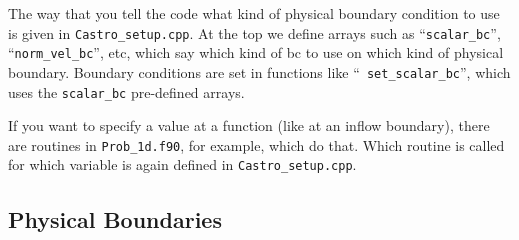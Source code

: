 The way that you tell the code what kind of physical boundary
condition to use is given in {\tt Castro\_setup.cpp}. At the top we
define arrays such as ``{\tt scalar\_bc}'', ``{\tt norm\_vel\_bc}'',
etc, which say which kind of bc to use on which kind of physical
boundary.  Boundary conditions are set in functions like ``{\tt
  set\_scalar\_bc}'', which uses the {\tt scalar\_bc} pre-defined
arrays.

If you want to specify a value at a function (like at an inflow
boundary), there are routines in {\tt Prob\_1d.f90}, for example, which do
that. Which routine is called for which variable is again defined in
{\tt Castro\_setup.cpp}.


\subsection{Physical Boundaries}

